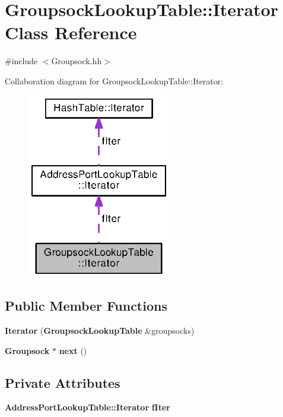 \section{Groupsock\+Lookup\+Table\+:\+:Iterator Class Reference}
\label{classGroupsockLookupTable_1_1Iterator}


{\ttfamily \#include $<$Groupsock.\+hh$>$}



Collaboration diagram for Groupsock\+Lookup\+Table\+:\+:Iterator\+:
\nopagebreak
\begin{figure}[H]
\begin{center}
\leavevmode
\includegraphics[width=178pt]{classGroupsockLookupTable_1_1Iterator__coll__graph}
\end{center}
\end{figure}
\subsection*{Public Member Functions}
\begin{DoxyCompactItemize}
\item 
{\bf Iterator} ({\bf Groupsock\+Lookup\+Table} \&groupsocks)
\item 
{\bf Groupsock} $\ast$ {\bf next} ()
\end{DoxyCompactItemize}
\subsection*{Private Attributes}
\begin{DoxyCompactItemize}
\item 
{\bf Address\+Port\+Lookup\+Table\+::\+Iterator} {\bf f\+Iter}
\end{DoxyCompactItemize}


